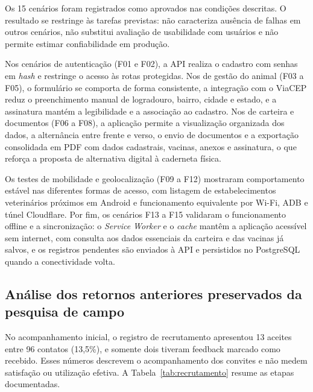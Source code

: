 \documentclass{UNESC}
\begin{document}
Os 15 cenários foram registrados como aprovados nas condições descritas. O resultado se restringe às tarefas previstas: não caracteriza ausência de falhas em outros cenários, não substitui avaliação de usabilidade com usuários e não permite estimar confiabilidade em produção.

Nos cenários de autenticação (F01 e F02), a API realiza o cadastro com senhas em \textit{hash} e restringe o acesso às rotas protegidas. Nos de gestão do animal (F03 a F05), o formulário se comporta de forma consistente, a integração com o ViaCEP reduz o preenchimento manual de logradouro, bairro, cidade e estado, e a assinatura mantém a legibilidade e a associação ao cadastro. Nos de carteira e documentos (F06 a F08), a aplicação permite a visualização organizada dos dados, a alternância entre frente e verso, o envio de documentos e a exportação consolidada em PDF com dados cadastrais, vacinas, anexos e assinatura, o que reforça a proposta de alternativa digital à caderneta física.

Os testes de mobilidade e geolocalização (F09 a F12) mostraram comportamento estável nas diferentes formas de acesso, com listagem de estabelecimentos veterinários próximos em Android e funcionamento equivalente por Wi-Fi, ADB e túnel Cloudflare. Por fim, os cenários F13 a F15 validaram o funcionamento offline e a sincronização: o \textit{Service Worker} e o \textit{cache} mantêm a aplicação acessível sem internet, com consulta aos dados essenciais da carteira e das vacinas já salvos, e os registros pendentes são enviados à API e persistidos no PostgreSQL quando a conectividade volta.

\subsection{Análise dos retornos anteriores preservados da pesquisa de campo}

No acompanhamento inicial, o registro de recrutamento apresentou 13 aceites entre 96 contatos (13,5\%), e somente dois tiveram feedback marcado como recebido. Esses números descrevem o acompanhamento dos convites e não medem satisfação ou utilização efetiva. A Tabela~\ref{tab:recrutamento} resume as etapas documentadas.
\end{document}
